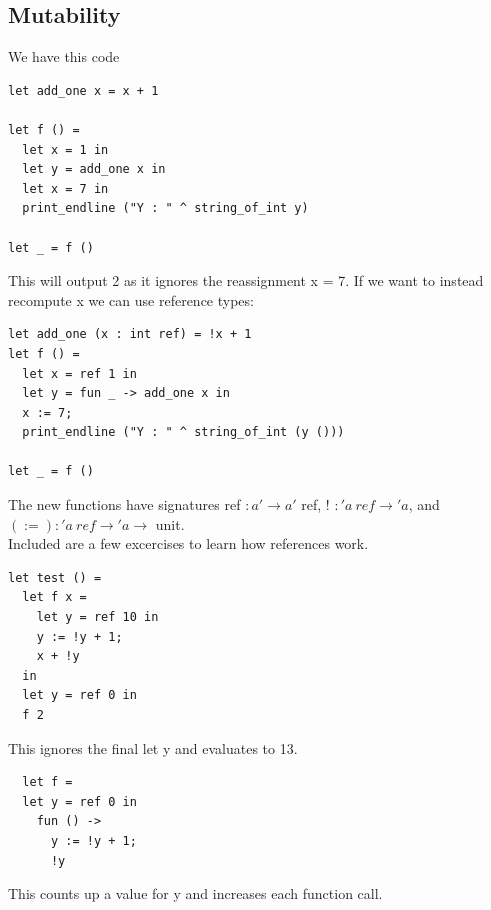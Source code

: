 \subsection{Mutability}
We have this code
\begin{lstlisting}
let add_one x = x + 1

let f () =
  let x = 1 in
  let y = add_one x in
  let x = 7 in
  print_endline ("Y : " ^ string_of_int y)

let _ = f ()

\end{lstlisting}
This will output 2 as it ignores the reassignment x = 7. If we want to instead recompute x we can use reference types:
\begin{lstlisting}
let add_one (x : int ref) = !x + 1
let f () =
  let x = ref 1 in
  let y = fun _ -> add_one x in
  x := 7;
  print_endline ("Y : " ^ string_of_int (y ()))

let _ = f ()
\end{lstlisting}
The new functions have signatures ref $: a' \to a'$ ref, ! $: 'a \: ref \to 'a$, and $(:=) : 'a \: ref \to 'a \to $ unit.
\\
Included are a few excercises to learn how references work.
\begin{lstlisting}
let test () =
  let f x =
    let y = ref 10 in
    y := !y + 1;
    x + !y
  in
  let y = ref 0 in
  f 2
\end{lstlisting}
This ignores the final let y and evaluates to 13. 

\begin{lstlisting}
  let f = 
  let y = ref 0 in
    fun () ->
      y := !y + 1;
      !y
\end{lstlisting}
This counts up a value for y and increases each function call.
